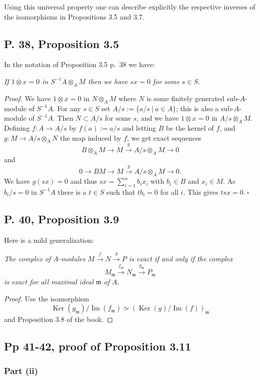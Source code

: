 \documentclass[parskip=half,fontsize=12pt]{scrartcl}%
\newcommand{\oo}{\operatorname}\newcommand{\ooo}{\operatorname*}
\newcommand{\mf}{\mathfrak}
\newcommand{\mmm}{\mf m}
\newcommand{\xr}{\xrightarrow}
\begin{document}
Using this universal property one can describe explicitly the respective inverses of the isomorphisms in Propositions 3.5 and 3.7.

\subsection{P. 38, Proposition 3.5}%

In the notation of Proposition 3.5 p.~38 we have:

\emph{If $1\otimes x=0$ in $S^{-1}A\otimes_AM$ then we have $sx=0$ for some} $s\in S$.

\emph{Proof.} We have $1\otimes x=0$ in $N\otimes_AM$ where $N$ is some finitely generated sub-$A$-module of $S^{-1}A$. For any $s\in S$ set $A/s:=\{a/s\ |\ a\in A\}$; this is also a sub-$A$-module of $S^{-1}A$. Then $N\subset A/s$ for some $s$, and we have $1\otimes x=0$ in $A/s\otimes_AM$. Defining $f:A\to A/s$ by $f(a):=a/s$ and letting $B$ be the kernel of $f$, and $g:M\to A/s\otimes_AN$ the map induced by $f$, we get exact sequences 
$$
B\otimes_AM\to M\xr gA/s\otimes_AM\to0
$$ 
and 
$$
0\to BM\to M\xr gA/s\otimes_AM\to0.
$$ 
We have $g(sx)=0$ and thus $sx=\sum_{i=1}^nb_ix_i$ with $b_i\in B$ and $x_i\in M$. As $b_i/s=0$ in $S^{-1}A$ there is a $t\in S$ such that $tb_i=0$ for all $i$. This gives $tsx=0.\ \square$

\subsection{P. 40, Proposition 3.9}\label{re}%

Here is a mild generalization:

\emph{The complex of $A$-modules $M\xr fN\xr g P$ is exact if and only if the complex} 
$$
M_\mmm\xr{f_\mmm}N_\mmm\xr{g_\mmm}P_\mmm
$$ 
\emph{is exact for all maximal ideal $\mmm$ of} $A$.
\begin{proof}
Use the isomorphism 
$$
\oo{Ker}(g_\mmm)/\oo{Im}(f_\mmm)\simeq(\oo{Ker}(g)/\oo{Im}(f))_\mmm
$$ 
and Proposition 3.8 of the book.
\end{proof}

\subsection{Pp 41-42, proof of Proposition 3.11}%

\subsubsection{Part (ii)}
\end{document}
